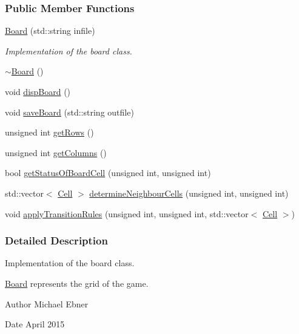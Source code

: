 \subsubsection*{Public Member Functions}
\begin{DoxyCompactItemize}
\item 
\hyperlink{a00009_a3ecf2f7109b2a94636cf28ba866c97a8}{Board} (std\+::string infile)
\begin{DoxyCompactList}\small\item\em Implementation of the board class. \end{DoxyCompactList}\item 
\hyperlink{a00009_af73f45730119a1fd8f6670f53f959e68}{$\sim$\+Board} ()
\item 
void \hyperlink{a00009_ae14af0610917234d129937c7f13100ef}{disp\+Board} ()
\item 
void \hyperlink{a00009_ac3e0bf4f63d1954592ca8c5b2be0dded}{save\+Board} (std\+::string outfile)
\item 
unsigned int \hyperlink{a00009_a4ec848a39465f40ccb1e371f6eba10d9}{get\+Rows} ()
\item 
unsigned int \hyperlink{a00009_a506e819879ada7d016090c0c3f752e2c}{get\+Columns} ()
\item 
bool \hyperlink{a00009_a8246ade37e9231a374a5317a11843f7d}{get\+Status\+Of\+Board\+Cell} (unsigned int, unsigned int)
\item 
std\+::vector$<$ \hyperlink{a00011}{Cell} $>$ \hyperlink{a00009_aba3e60929ecd1a1867118e907c2078af}{determine\+Neighbour\+Cells} (unsigned int, unsigned int)
\item 
void \hyperlink{a00009_a44a834577815ef24c8ca9aff48485207}{apply\+Transition\+Rules} (unsigned int, unsigned int, std\+::vector$<$ \hyperlink{a00011}{Cell} $>$)
\end{DoxyCompactItemize}


\subsubsection{Detailed Description}
Implementation of the board class. 

\hyperlink{a00009}{Board} represents the grid of the game.

\begin{DoxyAuthor}{Author}
Michael Ebner 
\end{DoxyAuthor}
\begin{DoxyDate}{Date}
April 2015 
\end{DoxyDate}



